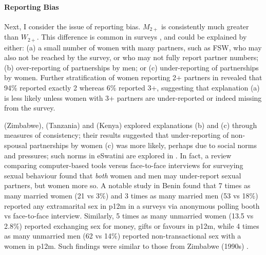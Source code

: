 \paragraph{Reporting Bias}
Next, I consider the issue of reporting bias.
$M_{2+}$ is consistently much greater than $W_{2+}$.
This difference is common in surveys \cite{Todd2009,Higgins2010}, and could be explained by either:
(a) a small number of women with many partners,
such as FSW, who may also not be reached by the survey,
or who may not fully report partner numbers;
(b) over-reporting of partnerships by men; or
(c) under-reporting of partnerships by women.
Further stratification of women reporting 2+ partners in \cite[Table~14.7.1]{SDHS2006}
revealed that 94\% reported exactly 2 whereas 6\% reported 3+,
suggesting that explanation (a) is less likely unless
women with 3+ partners are under-reported or indeed missing from the survey.
\par
\citet{Gregson2002} (Zimbabwe), \citet{Nnko2004} (Tanzania) and \citet{Clark2011} (Kenya)
explored explanations (b) and (c) through measures of consistency; their results suggested that
under-reporting of non-spousal partnerships by women (c) was more likely,
perhaps due to social norms and pressures;
such norms in eSwatini are explored in \cite{Ruark2019,Pulerwitz2021}.
In fact, a review comparing computer-based tools versus face-to-face interviews
for surveying sexual behaviour \cite{Langhaug2010} found that
\emph{both} women and men may under-report sexual partners, but women more so.
A notable study in Benin \cite{Behanzin2013} found that
7 times as many married women (21 vs 3\%) and 3 times as many married men (53 vs 18\%)
reported any extramarital sex in p12m
in a surveys via anonymous polling booth vs face-to-face interview.
Similarly, 5 times as many unmarried women (13.5 vs 2.8\%) reported
exchanging sex for money, gifts or favours in p12m, while
4 times as many unmarried men (62 vs 14\%) reported non-transactional sex with a women in p12m.
Such findings were similar to those from Zimbabwe (1990s) \cite{Gregson2002}.
